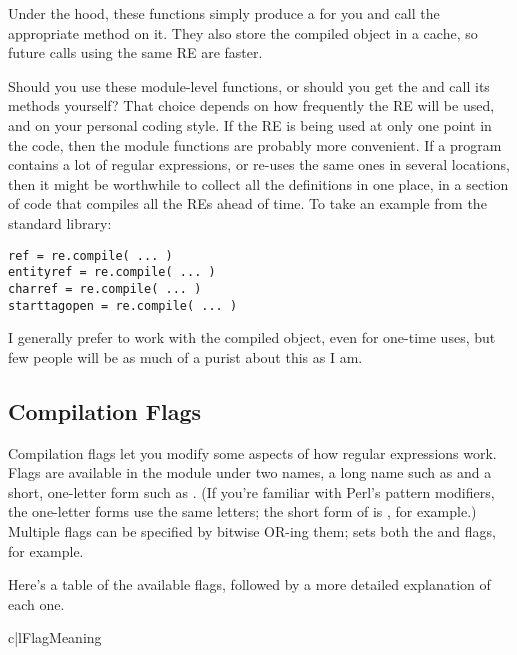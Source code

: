 \documentclass{howto}
\begin{document}
Under the hood, these functions simply produce a 
for you and call the appropriate method on it.  They also store the
compiled object in a cache, so future calls using the same
RE are faster.  

Should you use these module-level functions, or should you get the
 and call its methods yourself?  That choice
depends on how frequently the RE will be used, and on your personal
coding style.  If the RE is being used at only one point in the code,
then the module functions are probably more convenient.  If a program
contains a lot of regular expressions, or re-uses the same ones in
several locations, then it might be worthwhile to collect all the
definitions in one place, in a section of code that compiles all the
REs ahead of time.  To take an example from the standard library:

\begin{verbatim}
ref = re.compile( ... )
entityref = re.compile( ... )
charref = re.compile( ... )
starttagopen = re.compile( ... )
\end{verbatim}

I generally prefer to work with the compiled object, even for
one-time uses, but few people will be as much of a purist about this
as I am.

\subsection{Compilation Flags}

Compilation flags let you modify some aspects of how regular
expressions work.  Flags are available in the  module under
two names, a long name such as  and a short,
one-letter form such as .  (If you're familiar with Perl's
pattern modifiers, the one-letter forms use the same letters; the
short form of  is , for example.)
Multiple flags can be specified by bitwise OR-ing them;  sets both the  and  flags, for example.

Here's a table of the available flags, followed by
a more detailed explanation of each one.

\begin{tableii}{c|l}{}{Flag}{Meaning}
\end{tableii}
\end{document}
